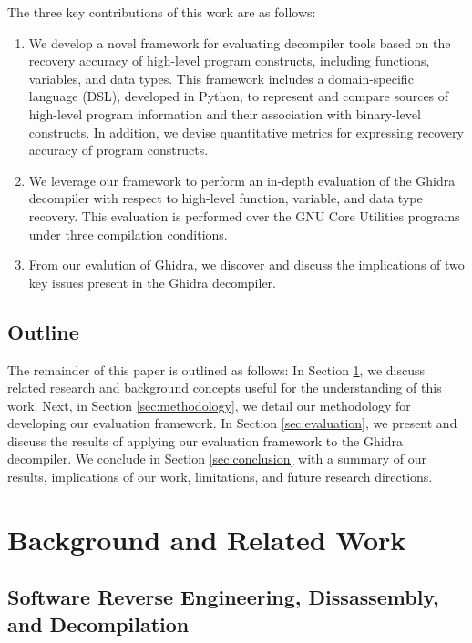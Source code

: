 \documentclass[conference]{IEEEtran}
\begin{document}
The three key contributions of this work are as follows:
\begin{enumerate}
    \item We develop a novel framework for evaluating decompiler tools based on the recovery accuracy of high-level program constructs, including functions, variables, and data types. This framework includes a domain-specific language (DSL), developed in Python, to represent and compare sources of high-level program information and their association with binary-level constructs. In addition, we devise quantitative metrics for expressing recovery accuracy of program constructs.
    \item We leverage our framework to perform an in-depth evaluation of the Ghidra decompiler with respect to high-level function, variable, and data type recovery. This evaluation is performed over the GNU Core Utilities programs under three compilation conditions.
    \item From our evalution of Ghidra, we discover and discuss the implications of two key issues present in the Ghidra decompiler.
\end{enumerate}

\subsection{Outline}

The remainder of this paper is outlined as follows: In Section \ref{sec:background-related-work}, we discuss related research and background concepts useful for the understanding of this work. Next, in Section \ref{sec:methodology}, we detail our methodology for developing our evaluation framework. In Section \ref{sec:evaluation}, we present and discuss the results of applying our evaluation framework to the Ghidra decompiler. We conclude in Section \ref{sec:conclusion} with a summary of our results, implications of our work, limitations, and future research directions.

\section{Background and Related Work} \label{sec:background-related-work}

\subsection{Software Reverse Engineering, Dissassembly, and Decompilation}
\end{document}

